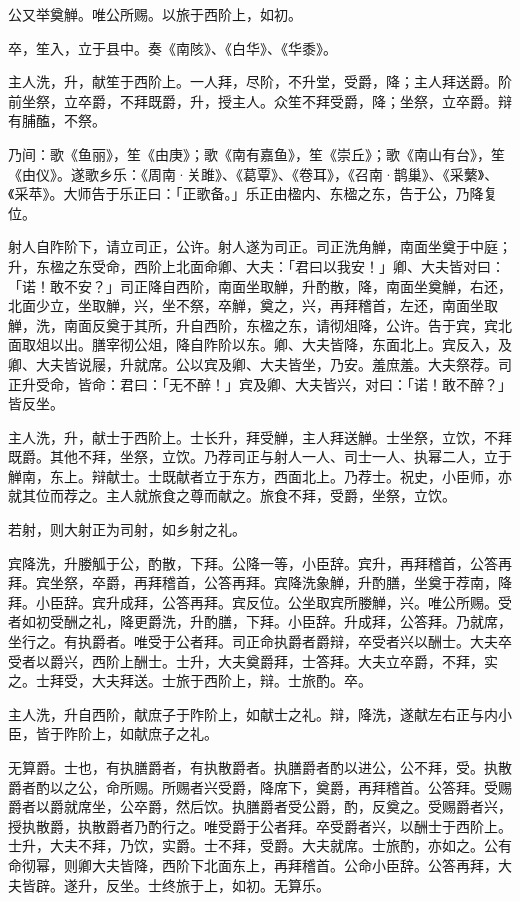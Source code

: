 \documentclass[]{article}
\begin{document}
公又举奠觯。唯公所赐。以旅于西阶上，如初。

卒，笙入，立于县中。奏《南陔》、《白华》、《华黍》。

主人洗，升，献笙于西阶上。一人拜，尽阶，不升堂，受爵，降；主人拜送爵。阶前坐祭，立卒爵，不拜既爵，升，授主人。众笙不拜受爵，降；坐祭，立卒爵。辩有脯醢，不祭。

乃间：歌《鱼丽》，笙《由庚》；歌《南有嘉鱼》，笙《崇丘》；歌《南山有台》，笙《由仪》。遂歌乡乐：《周南·关雎》、《葛覃》、《卷耳》，《召南·鹊巢》、《采蘩》、《采苹》。大师告于乐正曰：「正歌备。」乐正由楹内、东楹之东，告于公，乃降复位。

射人自阼阶下，请立司正，公许。射人遂为司正。司正洗角觯，南面坐奠于中庭；升，东楹之东受命，西阶上北面命卿、大夫：「君曰以我安！」卿、大夫皆对曰：「诺！敢不安？」司正降自西阶，南面坐取觯，升酌散，降，南面坐奠觯，右还，北面少立，坐取觯，兴，坐不祭，卒觯，奠之，兴，再拜稽首，左还，南面坐取觯，洗，南面反奠于其所，升自西阶，东楹之东，请彻俎降，公许。告于宾，宾北面取俎以出。膳宰彻公俎，降自阼阶以东。卿、大夫皆降，东面北上。宾反入，及卿、大夫皆说屦，升就席。公以宾及卿、大夫皆坐，乃安。羞庶羞。大夫祭荐。司正升受命，皆命：君曰：「无不醉！」宾及卿、大夫皆兴，对曰：「诺！敢不醉？」皆反坐。

主人洗，升，献士于西阶上。士长升，拜受觯，主人拜送觯。士坐祭，立饮，不拜既爵。其他不拜，坐祭，立饮。乃荐司正与射人一人、司士一人、执幂二人，立于觯南，东上。辩献士。士既献者立于东方，西面北上。乃荐士。祝史，小臣师，亦就其位而荐之。主人就旅食之尊而献之。旅食不拜，受爵，坐祭，立饮。

若射，则大射正为司射，如乡射之礼。

宾降洗，升媵觚于公，酌散，下拜。公降一等，小臣辞。宾升，再拜稽首，公答再拜。宾坐祭，卒爵，再拜稽首，公答再拜。宾降洗象觯，升酌膳，坐奠于荐南，降拜。小臣辞。宾升成拜，公答再拜。宾反位。公坐取宾所媵觯，兴。唯公所赐。受者如初受酬之礼，降更爵洗，升酌膳，下拜。小臣辞。升成拜，公答拜。乃就席，坐行之。有执爵者。唯受于公者拜。司正命执爵者爵辩，卒受者兴以酬士。大夫卒受者以爵兴，西阶上酬士。士升，大夫奠爵拜，士答拜。大夫立卒爵，不拜，实之。士拜受，大夫拜送。士旅于西阶上，辩。士旅酌。卒。

主人洗，升自西阶，献庶子于阼阶上，如献士之礼。辩，降洗，遂献左右正与内小臣，皆于阼阶上，如献庶子之礼。

无算爵。士也，有执膳爵者，有执散爵者。执膳爵者酌以进公，公不拜，受。执散爵者酌以之公，命所赐。所赐者兴受爵，降席下，奠爵，再拜稽首。公答拜。受赐爵者以爵就席坐，公卒爵，然后饮。执膳爵者受公爵，酌，反奠之。受赐爵者兴，授执散爵，执散爵者乃酌行之。唯受爵于公者拜。卒受爵者兴，以酬士于西阶上。士升，大夫不拜，乃饮，实爵。士不拜，受爵。大夫就席。士旅酌，亦如之。公有命彻幂，则卿大夫皆降，西阶下北面东上，再拜稽首。公命小臣辞。公答再拜，大夫皆辟。遂升，反坐。士终旅于上，如初。无算乐。
\end{document}
